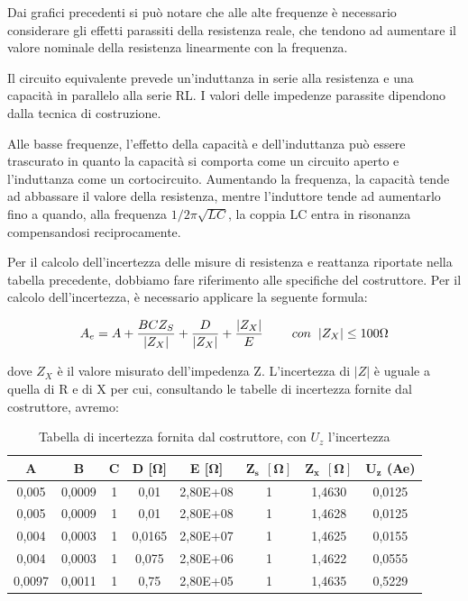 Dai grafici precedenti si può notare che alle alte frequenze è necessario considerare gli effetti parassiti della resistenza reale, che tendono ad aumentare il valore nominale della resistenza linearmente con la frequenza.

Il circuito equivalente prevede un'induttanza in serie alla resistenza e una capacità in parallelo alla serie RL. I valori delle impedenze parassite dipendono dalla tecnica di costruzione.

Alle basse frequenze, l'effetto della capacità e dell'induttanza può essere trascurato in quanto la capacità si comporta come un circuito aperto e l'induttanza come un cortocircuito. Aumentando la frequenza, la capacità tende ad abbassare il valore della resistenza, mentre l'induttore tende ad aumentarlo fino a quando, alla frequenza $1/2\pi\sqrt{LC}$, la coppia LC entra in risonanza compensandosi reciprocamente.

Per il calcolo dell'incertezza delle misure di resistenza e reattanza riportate nella tabella precedente, dobbiamo fare riferimento alle specifiche del costruttore. Per il calcolo dell'incertezza, è necessario applicare la seguente formula:

\begin{equation}
    A_e = A + \frac{BCZ_S}{|Z_X|} + \frac{D}{|Z_X|} + \frac{|Z_X|}{E} \hspace{0,8cm} con \hspace{0,2cm} |Z_X| \leq 100\Omega
\end{equation}

dove $Z_X$ è il valore misurato dell’impedenza Z. L’incertezza di $|Z|$ è uguale a quella di 
R e di X per cui, consultando le tabelle di incertezza fornite dal costruttore, avremo:


\begin{table}[!ht]
\centering
\begin{tabular}{|c|c|c|c|c|c|c|c|}
\hline
\textbf{A}      & \textbf{B}      & \textbf{C} & \textbf{D [$\bm{\Omega}$]} & \textbf{E [$\bm{\Omega}$]}  & $\bm{Z_s \ \ [\Omega]}$ & $\bm{Z_x \ \ [\Omega]}$ & $\bm{U_z}$ \textbf{(Ae)} \\ \hline
0,005  & 0,0009 & 1 & 0,01      & 2,80E+08  & 1          & 1,4630     & 0,0125  \\ \hline
0,005  & 0,0009 & 1 & 0,01      & 2,80E+08  & 1          & 1,4628     & 0,0125  \\ \hline
0,004  & 0,0003 & 1 & 0,0165    & 2,80E+07  & 1          & 1,4625     & 0,0155  \\ \hline
0,004  & 0,0003 & 1 & 0,075     & 2,80E+06  & 1          & 1,4622     & 0,0555  \\ \hline
0,0097 & 0,0011 & 1 & 0,75      & 2,80E+05  & 1          & 1,4635     & 0,5229  \\ \hline
\end{tabular}
\caption{Tabella di incertezza fornita dal costruttore, con $U_z$ l'incertezza}
\label{tab:lcr_z_sheet}
\end{table}
\FloatBarrier

